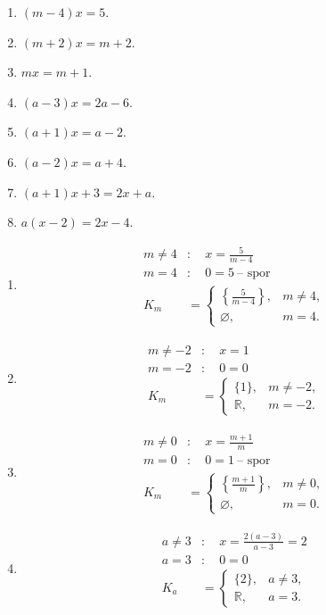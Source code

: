 \documentclass[11pt,a4paper]{article}
\begin{document}
\begin{zadaniReseniBox}[title={Domácí úkol}]
\begin{enumerate}[label=\alph*),itemsep=2pt]
\item $(m-4)x=5$.
\item $(m+2)x=m+2$.
\item $mx=m+1$.
\item $(a-3)x=2a-6$.
\item $(a+1)x=a-2$.
\item $(a-2)x=a+4$.
\item $(a+1)x+3=2x+a$.
\item $a(x-2)=2x-4$.
\end{enumerate}
\tcblower
\begin{enumerate}[label=\alph*),itemsep=1pt]
\item
\[\begin{aligned}
m\ne4&:\quad x=\frac5{m-4} \\
m=4&:\quad0=5\ \text{-- spor} \\
K_m&=\begin{cases}\left\{\frac5{m-4}\right\},&m\ne4,\\\varnothing,&m=4.\end{cases}
\end{aligned}\]
\item
\[\begin{aligned}
m\ne-2&:\quad x=1 \\
m=-2&:\quad0=0 \\
K_m&=\begin{cases}\{1\},&m\ne-2,\\\mathbb R,&m=-2.\end{cases}
\end{aligned}\]
\item
\[\begin{aligned}
m\ne0&:\quad x=\frac{m+1}{m} \\
m=0&:\quad0=1\ \text{-- spor} \\
K_m&=\begin{cases}\left\{\frac{m+1}{m}\right\},&m\ne0,\\\varnothing,&m=0.\end{cases}
\end{aligned}\]
\item
\[\begin{aligned}
a\ne3&:\quad x=\frac{2(a-3)}{a-3}=2 \\
a=3&:\quad0=0 \\
K_a&=\begin{cases}\{2\},&a\ne3,\\\mathbb R,&a=3.\end{cases}

\end{aligned}\]
\end{enumerate}
\end{zadaniReseniBox}
\end{document}
